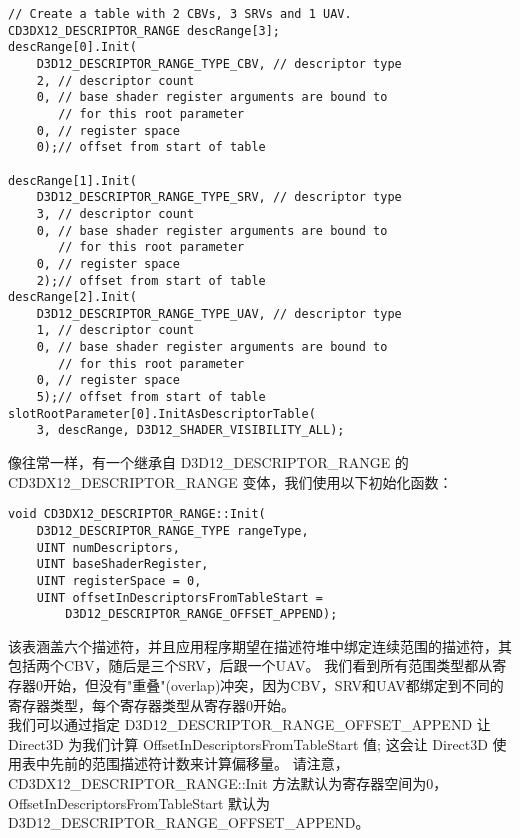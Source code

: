 \begin{lstlisting}
// Create a table with 2 CBVs, 3 SRVs and 1 UAV.
CD3DX12_DESCRIPTOR_RANGE descRange[3];
descRange[0].Init(
    D3D12_DESCRIPTOR_RANGE_TYPE_CBV, // descriptor type
    2, // descriptor count
    0, // base shader register arguments are bound to 
       // for this root parameter
    0, // register space
    0);// offset from start of table

descRange[1].Init(
    D3D12_DESCRIPTOR_RANGE_TYPE_SRV, // descriptor type
    3, // descriptor count
    0, // base shader register arguments are bound to 
       // for this root parameter
    0, // register space
    2);// offset from start of table
descRange[2].Init(
    D3D12_DESCRIPTOR_RANGE_TYPE_UAV, // descriptor type
    1, // descriptor count
    0, // base shader register arguments are bound to 
       // for this root parameter
    0, // register space
    5);// offset from start of table
slotRootParameter[0].InitAsDescriptorTable(
    3, descRange, D3D12_SHADER_VISIBILITY_ALL);
\end{lstlisting}

\begin{flushleft}
像往常一样，有一个继承自 D3D12\_DESCRIPTOR\_RANGE 的 CD3DX12\_DESCRIPTOR\_RANGE 变体，我们使用以下初始化函数：\\
\end{flushleft}

\begin{lstlisting}
void CD3DX12_DESCRIPTOR_RANGE::Init(
    D3D12_DESCRIPTOR_RANGE_TYPE rangeType,
    UINT numDescriptors,
    UINT baseShaderRegister,
    UINT registerSpace = 0,
    UINT offsetInDescriptorsFromTableStart =
        D3D12_DESCRIPTOR_RANGE_OFFSET_APPEND);
\end{lstlisting}

\begin{flushleft}
该表涵盖六个描述符，并且应用程序期望在描述符堆中绑定连续范围的描述符，其包括两个CBV，随后是三个SRV，后跟一个UAV。 我们看到所有范围类型都从寄存器0开始，但没有"重叠"(overlap)冲突，因为CBV，SRV和UAV都绑定到不同的寄存器类型，每个寄存器类型从寄存器0开始。\\
我们可以通过指定 D3D12\_DESCRIPTOR\_RANGE\_OFFSET\_APPEND 让 Direct3D 为我们计算 OffsetInDescriptorsFromTableStart 值; 这会让 Direct3D 使用表中先前的范围描述符计数来计算偏移量。 请注意，CD3DX12\_DESCRIPTOR\_RANGE::Init 方法默认为寄存器空间为0，OffsetInDescriptorsFromTableStart 默认为 D3D12\_DESCRIPTOR\_RANGE\_OFFSET\_APPEND。\\
\end{flushleft}

